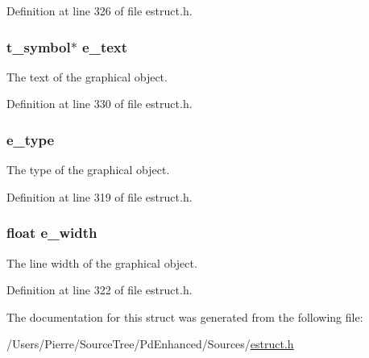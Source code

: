 Definition at line 326 of file estruct.\-h.

\hypertarget{struct__egobj_a5f97b246c0da885ff0cd44b32a967338}{
\subsubsection[{e\-\_\-text}]{\setlength{\rightskip}{0pt plus 5cm}t\-\_\-symbol$\ast$ e\-\_\-text}}\label{struct__egobj_a5f97b246c0da885ff0cd44b32a967338}
The text of the graphical object. 

Definition at line 330 of file estruct.\-h.

\hypertarget{struct__egobj_a8083c24bd4930af629d483d7bf45a20a}{
\subsubsection[{e\-\_\-type}]{ e\-\_\-type}}\label{struct__egobj_a8083c24bd4930af629d483d7bf45a20a}
The type of the graphical object. 

Definition at line 319 of file estruct.\-h.

\hypertarget{struct__egobj_abe0dac7e3167ea1dd6c4e238ab4ab8bd}{
\subsubsection[{e\-\_\-width}]{\setlength{\rightskip}{0pt plus 5cm}float e\-\_\-width}}\label{struct__egobj_abe0dac7e3167ea1dd6c4e238ab4ab8bd}
The line width of the graphical object. 

Definition at line 322 of file estruct.\-h.



The documentation for this struct was generated from the following file\-:\begin{DoxyCompactItemize}
\item 
/\-Users/\-Pierre/\-Source\-Tree/\-Pd\-Enhanced/\-Sources/\hyperlink{estruct_8h}{estruct.\-h}\end{DoxyCompactItemize}
